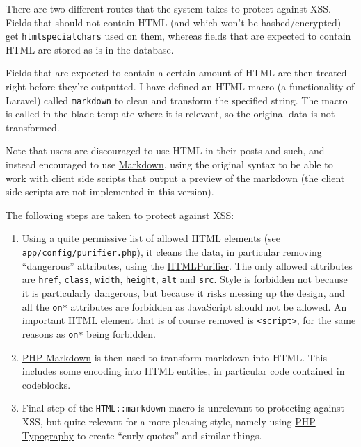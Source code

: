 There are two different routes that the system takes to protect against
XSS. Fields that should not contain HTML (and which won't be
hashed/encrypted) get \texttt{htmlspecialchars} used on them, whereas
fields that are expected to contain HTML are stored as-is in the
database.

Fields that are expected to contain a certain amount of HTML are then
treated right before they're outputted. I have defined an HTML macro (a
functionality of Laravel) called \texttt{markdown} to clean and
transform the specified string. The macro is called in the blade
template where it is relevant, so the original data is not transformed.

Note that users are discouraged to use HTML in their posts and such, and
instead encouraged to use
\href{http://daringfireball.net/projects/markdown/}{Markdown}, using the
original syntax to be able to work with client side scripts that output
a preview of the markdown (the client side scripts are not implemented
in this version).

The following steps are taken to protect against XSS:

\begin{enumerate}[1.]
\item
  Using a quite permissive list of allowed HTML elements (see
  \texttt{app/config/purifier.php}), it cleans the data, in particular
  removing ``dangerous'' attributes, using the
  \href{http://htmlpurifier.org/}{HTMLPurifier}. The only allowed
  attributes are \texttt{href}, \texttt{class}, \texttt{width},
  \texttt{height}, \texttt{alt} and \texttt{src}. Style is forbidden not
  because it is particularly dangerous, but because it risks messing up
  the design, and all the \texttt{on*} attributes are forbidden as
  JavaScript should not be allowed. An important HTML element that is of
  course removed is \texttt{\textless{}script\textgreater{}}, for the
  same reasons as \texttt{on*} being forbidden.
\item
  \href{http://michelf.ca/projects/php-markdown/}{PHP Markdown} is then
  used to transform markdown into HTML. This includes some encoding into
  HTML entities, in particular code contained in codeblocks.
\item
  Final step of the \texttt{HTML::markdown} macro is unrelevant to
  protecting against XSS, but quite relevant for a more pleasing style,
  namely using \href{https://github.com/adamaveray/PHPTypography}{PHP
  Typography} to create ``curly quotes'' and similar things.
\end{enumerate}

